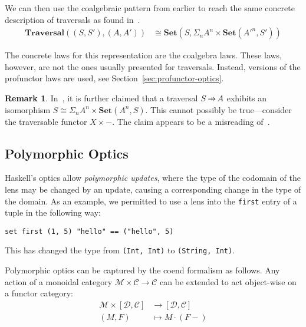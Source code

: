 \documentclass[11pt,letterpaper]{article}
\theoremstyle{plain}
\theoremstyle{definition}
\newtheorem{remark}[theorem]{Remark}
\newcommand{\C}{\mathscr{C}}
\newcommand{\D}{\mathscr{D}}
\newcommand{\M}{\mathscr{M}}
\newcommand{\Set}{\mathbf{Set}}
\newcommand{\Traversal}{\mathbf{Traversal}}
\newcommand{\act}{\cdot}
\newcommand{\hto}{\ensuremath{\,\mathaccent\shortmid\rightarrow\,}}
\begin{document}
We can then use the coalgebraic pattern from earlier to reach the same concrete description of traversals as found in~\cite{ProfunctorOptics}.
\begin{align*}
\Traversal((S, S'), (A, A')) &\cong \Set(S, \Sigma_n A^n \times \Set(A'^n,S'))
\end{align*}

The concrete laws for this representation are the coalgebra laws. These laws, however, are not the ones usually presented for traversals. Instead, versions of the profunctor laws are used, see Section~\ref{sec:profunctor-optics}.

\begin{remark}
In~\cite[Section 2.3]{ProfunctorOptics}, it is further claimed that a traversal $S \hto A$ exhibits an isomorphism $S \cong \Sigma_n A^n \times \Set(A^n,S)$. This cannot possibly be true---consider the traversable functor $X \times -$. The claim appears to be a misreading of~\cite[Proposition 5.4]{SecondOrderFunctionals}.
\end{remark}



\subsection{Polymorphic Optics}
Haskell's optics allow \emph{polymorphic updates}, where the type of the codomain of the lens may be changed by an update, causing a corresponding change in the type of the domain. As an example, we permitted to use a lens into the \texttt{first} entry of a tuple in the following way:
\begin{verbatim}
set first (1, 5) "hello" == ("hello", 5)
\end{verbatim}
This has changed the type from \texttt{(Int, Int)} to \texttt{(String, Int)}.

Polymorphic optics can be captured by the coend formalism as follows. Any action of a monoidal category $\M \times \C \to \C$ can be extended to act object-wise on a functor category:
\begin{align*}
  \M \times [\D, \C] &\to [\D, \C] \\
  (M, F) &\mapsto  M \act (F-)
\end{align*}
\end{document}
